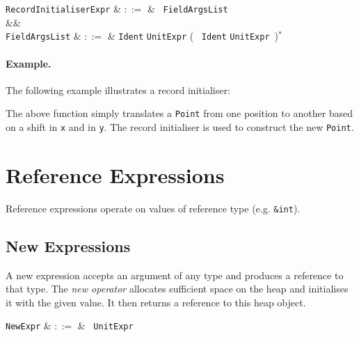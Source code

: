 \begin{syntax}
  \verb+RecordInitialiserExpr+ & $::=$ & \token{\{}\ \verb+FieldArgsList+\ \token{\}}\\
&&\\
  \verb+FieldArgsList+ & $::=$ & \verb+Ident+ \token{:} \verb+UnitExpr+ \big(\ \token{,} \verb+Ident+ \token{:} \verb+UnitExpr+\ \big)$^*$\\
\end{syntax}

\paragraph{Example.} The following example illustrates a record initialiser:



The above function simply translates a \lstinline{Point} from one position to another based on a shift in \lstinline{x} and in \lstinline{y}.  The record initialiser is used to construct the new \lstinline{Point}.

\section{Reference Expressions}

Reference expressions operate on values of reference type (e.g. \lstinline{&int}).


\subsection{New Expressions}
\label{c_expr_new}

A new expression accepts an argument of any type and produces a reference to that type.  The {\em new operator} allocates sufficient space on the heap and initialises it with the given value.  It then returns a reference to this heap object.

\begin{syntax}
\verb+NewExpr+ & $::=$ & \ \verb+UnitExpr+\\
\end{syntax}

